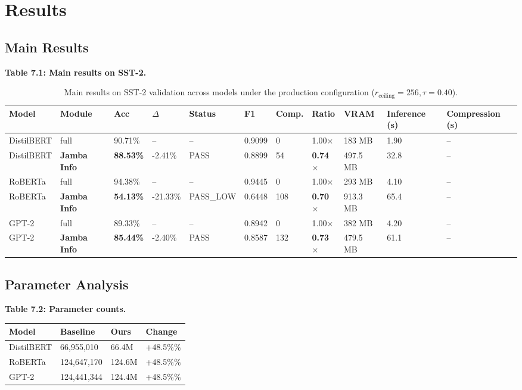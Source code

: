\section{Results}

\subsection{Main Results}

\textbf{Table 7.1: Main results on SST-2.}

\begin{table}[t]
\centering
\small
\begin{tabular}{lllllllllll}
\toprule
\textbf{Model} & \textbf{Module} & \textbf{Acc} & \textbf{$\Delta$} & \textbf{Status} & \textbf{F1} & \textbf{Comp.} & \textbf{Ratio} & \textbf{VRAM} & \textbf{Inference (s)} & \textbf{Compression (s)} \\
\midrule
DistilBERT & full & 90.71\% & -- & -- & 0.9099 & 0 & 1.00$\times$ & 183 MB & 1.90 & -- \\
DistilBERT & \textbf{Jamba Info} & \textbf{88.53\%} & -2.41\% & PASS & 0.8899 & 54 & \textbf{0.74$\times$} & 497.5 MB & 32.8 & -- \\
RoBERTa & full & 94.38\% & -- & -- & 0.9445 & 0 & 1.00$\times$ & 293 MB & 4.10 & -- \\
RoBERTa & \textbf{Jamba Info} & \textbf{54.13\%} & -21.33\% & PASS\_LOW & 0.6448 & 108 & \textbf{0.70$\times$} & 913.3 MB & 65.4 & -- \\
GPT-2 & full & 89.33\% & -- & -- & 0.8942 & 0 & 1.00$\times$ & 382 MB & 4.20 & -- \\
GPT-2 & \textbf{Jamba Info} & \textbf{85.44\%} & -2.40\% & PASS & 0.8587 & 132 & \textbf{0.73$\times$} & 479.5 MB & 61.1 & -- \\
\bottomrule
\end{tabular}
\caption{Main results on SST-2 validation across models under the production configuration ($r_{\mathrm{ceiling}}=256, \tau=0.40$).}
\label{tab:main_sst2}
\end{table}

\subsection{Parameter Analysis}

\textbf{Table 7.2: Parameter counts.}

\begin{table}[H]
\centering
\small
\begin{tabular}{llll}
\toprule
\textbf{Model} & \textbf{Baseline} & \textbf{Ours} & \textbf{Change} \\
\midrule
DistilBERT & 66,955,010 & 66.4M & +48.5\%\% \\
RoBERTa & 124,647,170 & 124.6M & +48.5\%\% \\
GPT-2 & 124,441,344 & 124.4M & +48.5\%\% \\
\bottomrule
\end{tabular}
\end{table}

